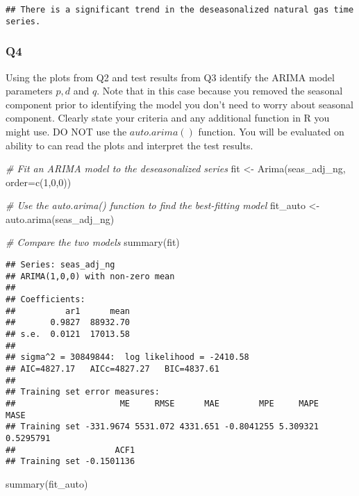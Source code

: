 \documentclass[
]{article}
\newenvironment{Shaded}{\begin{snugshade}}{\end{snugshade}}
\newcommand{\AttributeTok}[1]{\textcolor[rgb]{0.77,0.63,0.00}{#1}}
\newcommand{\CommentTok}[1]{\textcolor[rgb]{0.56,0.35,0.01}{\textit{#1}}}
\newcommand{\DecValTok}[1]{\textcolor[rgb]{0.00,0.00,0.81}{#1}}
\newcommand{\FunctionTok}[1]{\textcolor[rgb]{0.00,0.00,0.00}{#1}}
\newcommand{\NormalTok}[1]{#1}
\newcommand{\OtherTok}[1]{\textcolor[rgb]{0.56,0.35,0.01}{#1}}
\begin{document}
\begin{verbatim}
## There is a significant trend in the deseasonalized natural gas time series.
\end{verbatim}

\hypertarget{q4}{%
\subsubsection{Q4}\label{q4}}

Using the plots from Q2 and test results from Q3 identify the ARIMA
model parameters \(p,d\) and \(q\). Note that in this case because you
removed the seasonal component prior to identifying the model you don't
need to worry about seasonal component. Clearly state your criteria and
any additional function in R you might use. DO NOT use the
\(auto.arima()\) function. You will be evaluated on ability to can read
the plots and interpret the test results.

\begin{Shaded}
\begin{Highlighting}[]
\CommentTok{\# Fit an ARIMA model to the deseasonalized series}
\NormalTok{fit }\OtherTok{\textless{}{-}} \FunctionTok{Arima}\NormalTok{(seas\_adj\_ng, }\AttributeTok{order=}\FunctionTok{c}\NormalTok{(}\DecValTok{1}\NormalTok{,}\DecValTok{0}\NormalTok{,}\DecValTok{0}\NormalTok{))}

\CommentTok{\# Use the auto.arima() function to find the best{-}fitting model}
\NormalTok{fit\_auto }\OtherTok{\textless{}{-}} \FunctionTok{auto.arima}\NormalTok{(seas\_adj\_ng)}

\CommentTok{\# Compare the two models}
\FunctionTok{summary}\NormalTok{(fit)}
\end{Highlighting}
\end{Shaded}

\begin{verbatim}
## Series: seas_adj_ng 
## ARIMA(1,0,0) with non-zero mean 
## 
## Coefficients:
##          ar1      mean
##       0.9827  88932.70
## s.e.  0.0121  17013.58
## 
## sigma^2 = 30849844:  log likelihood = -2410.58
## AIC=4827.17   AICc=4827.27   BIC=4837.61
## 
## Training set error measures:
##                     ME     RMSE      MAE        MPE     MAPE      MASE
## Training set -331.9674 5531.072 4331.651 -0.8041255 5.309321 0.5295791
##                    ACF1
## Training set -0.1501136
\end{verbatim}

\begin{Shaded}
\begin{Highlighting}[]
\FunctionTok{summary}\NormalTok{(fit\_auto)}
\end{Highlighting}
\end{Shaded}
\end{document}
